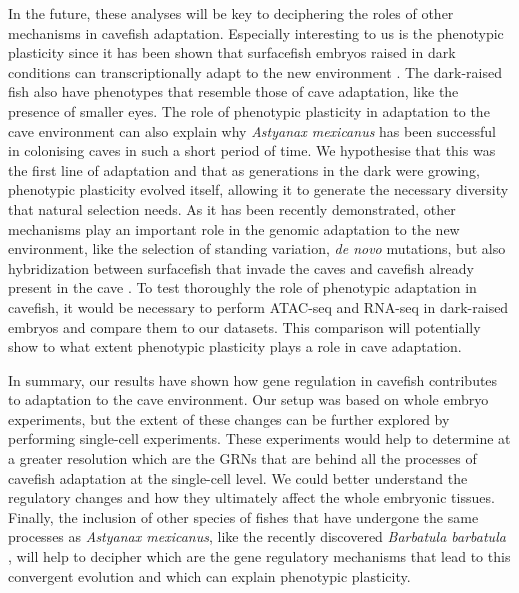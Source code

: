 In the future, these analyses will be key to deciphering the roles of other mechanisms in cavefish adaptation. Especially interesting to us is the phenotypic plasticity since it has been shown that surfacefish embryos raised in dark conditions can transcriptionally adapt to the new environment \parencite{bilandzija_phenotypic_2020}. The dark-raised fish also have phenotypes that resemble those of cave adaptation, like the presence of smaller eyes. The role of phenotypic plasticity in adaptation to the cave environment can also explain why \textit{Astyanax mexicanus} has been successful in colonising caves in such a short period of time. We hypothesise that this was the first line of adaptation and that as generations in the dark were growing, phenotypic plasticity evolved itself, allowing it to generate the necessary diversity that natural selection needs. As it has been recently demonstrated, other mechanisms play an important role in the genomic adaptation to the new environment, like the selection of standing variation, \textit{de novo}  mutations, but also hybridization between surfacefish that invade the caves and cavefish already present in the cave \parencite{herman_role_2018, moran_selection-driven_2023}. To test thoroughly the role of phenotypic adaptation in cavefish, it would be necessary to perform ATAC-seq and RNA-seq in dark-raised embryos and compare them to our datasets. This comparison will potentially show to what extent phenotypic plasticity plays a role in cave adaptation. 

In summary, our results have shown how gene regulation in cavefish contributes to adaptation to the cave environment. Our setup was based on whole embryo experiments, but the extent of these changes can be further explored by performing single-cell experiments. These experiments would help to determine at a greater resolution which are the GRNs that are behind all the processes of cavefish adaptation at the single-cell level. We could better understand the regulatory changes and how they ultimately affect the whole embryonic tissues.  Finally, the inclusion of other species of fishes that have undergone the same processes as \textit{Astyanax mexicanus}, like the recently discovered \textit{Barbatula barbatula} \parencite{behrmann-godel_phenotypic_2023}, will help to decipher which are the gene regulatory mechanisms that lead to this convergent evolution and which can explain phenotypic plasticity.



